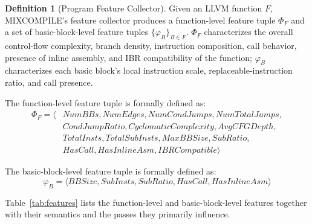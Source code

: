 \documentclass[5p,times,authoryear]{elsarticle}
\theoremstyle{plain}
\theoremstyle{definition}
\newtheorem{definition}{Definition}
\theoremstyle{remark}
\begin{document}
\begin{definition}[Program Feature Collector]
Given an LLVM function $F$, MIXCOMPILE's feature collector produces a function-level feature
tuple $\Phi_F$ and a set of basic-block-level feature tuples $\{\varphi_B\}_{B\in F}$.
$\Phi_F$ characterizes the overall control-flow complexity, branch density,
instruction composition, call behavior, presence of inline assembly, and IBR compatibility
of the function;
$\varphi_B$ characterizes each basic block's local instruction scale,
replaceable-instruction ratio, and call presence.
\end{definition}

The function-level feature tuple is formally defined as:
\begin{equation}
\begin{aligned}
\Phi_F = \langle & \mathit{NumBBs}, \mathit{NumEdges}, \mathit{NumCondJumps}, \mathit{NumTotalJumps}, \\
                 & \mathit{CondJumpRatio}, \mathit{CyclomaticComplexity}, \mathit{AvgCFGDepth}, \\
                 & \mathit{TotalInsts}, \mathit{TotalSubInsts}, \mathit{MaxBBSize}, \mathit{SubRatio}, \\
                 & \mathit{HasCall}, \mathit{HasInlineAsm}, \mathit{IBRCompatible} \rangle
\end{aligned}
\label{eq:func_features}
\end{equation}

The basic-block-level feature tuple is formally defined as:
\begin{equation}
\varphi_B = \langle \mathit{BBSize}, \mathit{SubInsts}, \mathit{SubRatio}, \mathit{HasCall}, \mathit{HasInlineAsm} \rangle
\label{eq:bb_features}
\end{equation}

Table~\ref{tab:features} lists the function-level and basic-block-level features together
with their semantics and the passes they primarily influence.
\end{document}
